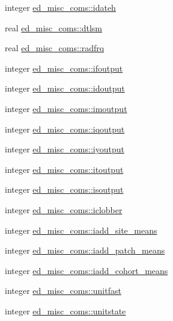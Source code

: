 \begin{DoxyCompactItemize}
\item 
integer \hyperlink{namespaceed__misc__coms_a7f0ac337a2c6f52fc1e034d5e0bfeb6b}{ed\+\_\+misc\+\_\+coms\+::idateh}
\item 
real \hyperlink{namespaceed__misc__coms_ae6a9bf60ef97f576201d615634834480}{ed\+\_\+misc\+\_\+coms\+::dtlsm}
\item 
real \hyperlink{namespaceed__misc__coms_aa6d6705e0925a134d7918ff8ac88f6f4}{ed\+\_\+misc\+\_\+coms\+::radfrq}
\item 
integer \hyperlink{namespaceed__misc__coms_a046bda1132eb5f39c1fe39ca6508b1ca}{ed\+\_\+misc\+\_\+coms\+::ifoutput}
\item 
integer \hyperlink{namespaceed__misc__coms_ac22da5c21a601d71d683d07a3b732986}{ed\+\_\+misc\+\_\+coms\+::idoutput}
\item 
integer \hyperlink{namespaceed__misc__coms_ac5c1b423c2cba321743173b47a45e456}{ed\+\_\+misc\+\_\+coms\+::imoutput}
\item 
integer \hyperlink{namespaceed__misc__coms_a789850d6ec992a19b7f4b55a9a4e6a31}{ed\+\_\+misc\+\_\+coms\+::iqoutput}
\item 
integer \hyperlink{namespaceed__misc__coms_ae5af5b7b96575dae64449b7cbfbd1b3f}{ed\+\_\+misc\+\_\+coms\+::iyoutput}
\item 
integer \hyperlink{namespaceed__misc__coms_a7076a7e73ecdf51253a8b73c0079b723}{ed\+\_\+misc\+\_\+coms\+::itoutput}
\item 
integer \hyperlink{namespaceed__misc__coms_ab282b2d1c8f6c839d29c674a1555a416}{ed\+\_\+misc\+\_\+coms\+::isoutput}
\item 
integer \hyperlink{namespaceed__misc__coms_a0b50bf271a33820e2e49a4c73569359a}{ed\+\_\+misc\+\_\+coms\+::iclobber}
\item 
integer \hyperlink{namespaceed__misc__coms_a173b15b7afdca1ac04fd16722535f46c}{ed\+\_\+misc\+\_\+coms\+::iadd\+\_\+site\+\_\+means}
\item 
integer \hyperlink{namespaceed__misc__coms_a3ed7fe49d1b72bafa30e2c6ab9fdb104}{ed\+\_\+misc\+\_\+coms\+::iadd\+\_\+patch\+\_\+means}
\item 
integer \hyperlink{namespaceed__misc__coms_ab418543f9bf77ba4d91179475d255a35}{ed\+\_\+misc\+\_\+coms\+::iadd\+\_\+cohort\+\_\+means}
\item 
integer \hyperlink{namespaceed__misc__coms_a201ad3ab376db2b9861c473fa72f4ca4}{ed\+\_\+misc\+\_\+coms\+::unitfast}
\item 
integer \hyperlink{namespaceed__misc__coms_a5018c6cb5f287c675aba66d451e25afc}{ed\+\_\+misc\+\_\+coms\+::unitstate}

\end{DoxyCompactItemize}
